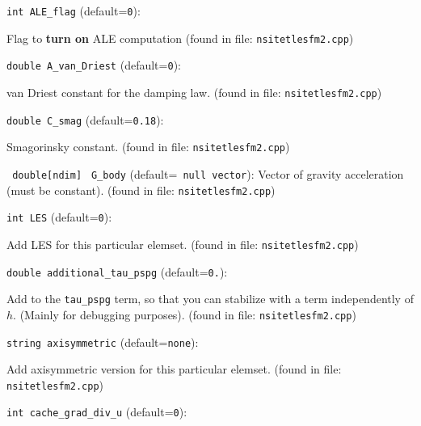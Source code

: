 \item\verb+int ALE_flag+ {\rm(default=\verb|0|)}:

Flag to \textbf{turn on} ALE computation
 (found in file: \verb+nsitetlesfm2.cpp+)
\item\verb+double A_van_Driest+ {\rm(default=\verb|0|)}:

van Driest constant for the damping law.
 (found in file: \verb+nsitetlesfm2.cpp+)
\item\verb+double C_smag+ {\rm(default=\verb|0.18|)}:

Smagorinsky constant.
 (found in file: \verb+nsitetlesfm2.cpp+)
\item\verb+ double[ndim]+ \verb+ G_body+ {\rm(default=\verb| null vector|)}:
 Vector of gravity acceleration (must be constant).  (found in file: \verb+nsitetlesfm2.cpp+)
\item\verb+int LES+ {\rm(default=\verb|0|)}:

Add LES for this particular elemset.
 (found in file: \verb+nsitetlesfm2.cpp+)
\item\verb+double additional_tau_pspg+ {\rm(default=\verb|0.|)}:

Add to the  \verb+tau_pspg+  term, so that you can stabilize with a term
 independently of $h$. (Mainly for debugging purposes). 
 (found in file: \verb+nsitetlesfm2.cpp+)
\item\verb+string axisymmetric+ {\rm(default=\verb|none|)}:

Add axisymmetric version for this particular elemset.
 (found in file: \verb+nsitetlesfm2.cpp+)
\item\verb+int cache_grad_div_u+ {\rm(default=\verb|0|)}:

